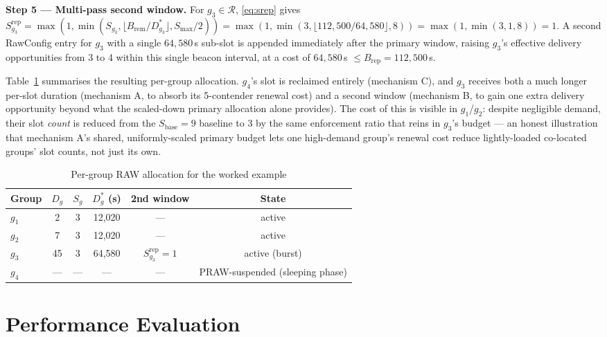 \documentclass[journal]{IEEEtran}
\begin{document}
\textbf{Step 5 --- Multi-pass second window.}
For $g_3\!\in\!\mathcal{R}$, \eqref{eq:srep} gives
$S_{g_3}^\mathrm{rep}\!=\!\max(1,\min(S_{g_3},
\lfloor B_\mathrm{rem}/D_{g_3}^{*}\rfloor, S_\mathrm{max}/2))\!=\!
\max(1,\min(3,\lfloor 112{,}500/64{,}580\rfloor,8))\!=\!
\max(1,\min(3,1,8))\!=\!1$.
A second RawConfig entry for $g_3$ with a single $64{,}580$\,\textmu{}s
sub-slot is appended immediately after the primary window, raising
$g_3$'s effective delivery opportunities from 3 to 4 within this
single beacon interval, at a cost of $64{,}580$\,\textmu{}s
$\!\leq\!B_\mathrm{rep}\!=\!112{,}500$\,\textmu{}s.

Table~\ref{tab:example} summarises the resulting per-group allocation.
$g_4$'s slot is reclaimed entirely (mechanism C), and $g_3$ receives
both a much longer per-slot duration (mechanism A, to absorb its
5-contender renewal cost) and a second window (mechanism B, to gain
one extra delivery opportunity beyond what the scaled-down primary
allocation alone provides).
The cost of this is visible in $g_1$/$g_2$: despite negligible demand,
their slot \emph{count} is reduced from the $S_\mathrm{base}\!=\!9$
baseline to 3 by the same enforcement ratio that reins in $g_3$'s
budget --- an honest illustration that mechanism A's shared,
uniformly-scaled primary budget lets one high-demand group's renewal
cost reduce lightly-loaded co-located groups' slot counts, not just
its own.

\begin{table}[!t]
\renewcommand{\arraystretch}{1.15}
\caption{Per-group RAW allocation for the worked example}
\label{tab:example}
\centering
\begin{tabular}{@{}lccccc@{}}
\toprule
\textbf{Group} & $D_g$ & $S_g$ & $D_g^{*}$ (\textmu{}s) & 2nd window & State \\
\midrule
$g_1$ & 2  & 3 & 12{,}020 & --- & active \\
$g_2$ & 7  & 3 & 12{,}020 & --- & active \\
$g_3$ & 45 & 3 & 64{,}580 & $S_{g_3}^\mathrm{rep}\!=\!1$ & active (burst) \\
$g_4$ & --- & --- & --- & --- & PRAW-suspended (sleeping phase) \\
\bottomrule
\end{tabular}
\end{table}

\section{Performance Evaluation}
\label{sec:eval}
\end{document}
